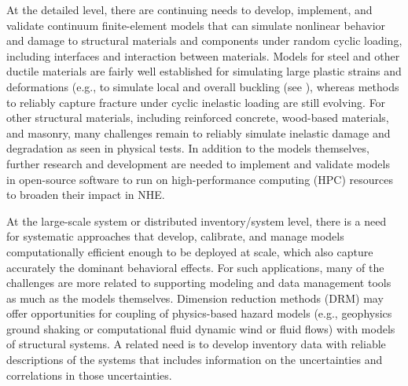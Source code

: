 At the detailed level, there are continuing needs to develop, implement, and validate continuum finite-element models that can simulate nonlinear behavior and damage to structural materials and components under random cyclic loading, including interfaces and interaction between materials. Models for steel and other ductile materials are fairly well established for simulating large plastic strains and deformations (e.g., to simulate local and overall buckling (see \cite{n.i.s.t.-a.t.c.2018blind}), whereas methods to reliably capture fracture under cyclic inelastic loading are still evolving. For other structural materials, including reinforced concrete, wood-based materials, and masonry, many challenges remain to reliably simulate inelastic damage and degradation as seen in physical tests. In addition to the models themselves, further research and development are needed to implement and validate models in open-source software to run on high-performance computing (HPC) resources to broaden their impact in NHE.

At the large-scale system or distributed inventory/system level, there is a need for systematic approaches that develop, calibrate, and manage models computationally efficient enough to be deployed at scale, which also capture accurately the dominant behavioral effects. For such applications, many of the challenges are more related to supporting modeling and data management tools as much as the models themselves. Dimension reduction methods (DRM) may offer opportunities for coupling of physics-based hazard models (e.g., geophysics ground shaking or computational fluid dynamic wind or fluid flows) with models of structural systems. A related need is to develop inventory data with reliable descriptions of the systems that includes information on the uncertainties and correlations in those uncertainties.